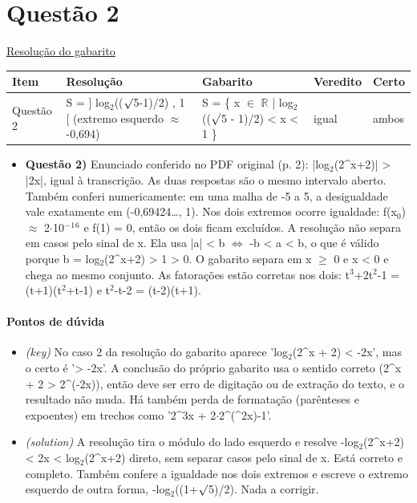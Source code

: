 \documentclass{article}%
\begin{document}
\section*{Questão 2}%
\href{https://poliedroresolve.sistemapoliedro.com.br/vestibulares/ita/2027/ita-2-fase-dia-1-20-10-2026-2-fase-dia-1/dissertativa-2-matematica-2-fase-dia-1-ita-2027}{Resolução do gabarito}\par\smallskip%
\begin{longtable}{@{}p{} p{} p{} p{} p{}@{}}\toprule Item & Resolução & Gabarito & Veredito & Certo \\ \midrule
Questão 2 & S = {]} log$_{2}$(($\surd$5-1)/2) , 1 {[}  (extremo esquerdo $\approx$ -0,694) & S = \{ x $\in$ $\mathbb{R}$ | log$_{2}$(($\surd$5 - 1)/2) < x < 1 \} & igual & ambos \\
\bottomrule\end{longtable}%
\begin{itemize}%
\item%
\textbf{Questão 2)} Enunciado conferido no PDF original (p. 2): |log$_{2}$(2\^{}x+2)| > |2x|, igual à transcrição. As duas respostas são o mesmo intervalo aberto. Também conferi numericamente: em uma malha de -5 a 5, a desigualdade vale exatamente em (-0,69424\ldots{}, 1). Nos dois extremos ocorre igualdade: f(x$_{0}$) $\approx$ 2$\cdot$10$^{-}$$^{1}$$^{6}$ e f(1) = 0, então os dois ficam excluídos. A resolução não separa em casos pelo sinal de x. Ela usa |a| < b $\Leftrightarrow$ -b < a < b, o que é válido porque b = log$_{2}$(2\^{}x+2) > 1 > 0. O gabarito separa em x $\geq$ 0 e x < 0 e chega ao mesmo conjunto. As fatorações estão corretas nos dois: t$^3$+2t$^2$-1 = (t+1)(t$^2$+t-1) e t$^2$-t-2 = (t-2)(t+1).%
\end{itemize}%
\paragraph{Pontos de dúvida}%
\begin{itemize}%
\item%
\textit{(key)} No caso 2 da resolução do gabarito aparece 'log$_{2}$(2\^{}x + 2) < -2x', mas o certo é '> -2x'. A conclusão do próprio gabarito usa o sentido correto (2\^{}x + 2 > 2\^{}(-2x)), então deve ser erro de digitação ou de extração do texto, e o resultado não muda. Há também perda de formatação (parênteses e expoentes) em trechos como '2\^{}3x + 2$\cdot$2\^{}(\^{}2x)-1'.%
\item%
\textit{(solution)} A resolução tira o módulo do lado esquerdo e resolve -log$_{2}$(2\^{}x+2) < 2x < log$_{2}$(2\^{}x+2) direto, sem separar casos pelo sinal de x. Está correto e completo. Também confere a igualdade nos dois extremos e escreve o extremo esquerdo de outra forma, -log$_{2}$((1+$\surd$5)/2). Nada a corrigir.%
\end{itemize}%
\end{document}
